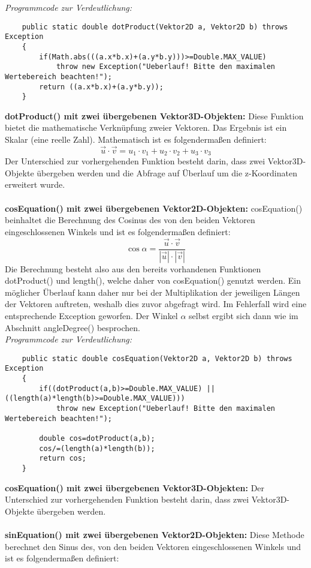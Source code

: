 \documentclass[a4paper,11pt]{scrartcl}
\begin{document}
\textit{Programmcode zur Verdeutlichung:}
\begin{lstlisting}
	public static double dotProduct(Vektor2D a, Vektor2D b) throws Exception
	{
		if(Math.abs(((a.x*b.x)+(a.y*b.y)))>=Double.MAX_VALUE)
			throw new Exception("Ueberlauf! Bitte den maximalen Wertebereich beachten!");
		return ((a.x*b.x)+(a.y*b.y));
	}
\end{lstlisting} $\;$ \\
\textbf{dotProduct() mit zwei übergebenen Vektor3D-Objekten:} Diese Funktion bietet die mathematische Verknüpfung zweier Vektoren. Das Ergebnis ist ein Skalar (eine reelle Zahl).
Mathematisch ist es folgendermaßen definiert:
\[ \vec u \cdot \vec v = u_1 \cdot v_1 + u_2 \cdot v_2 + u_3 \cdot v_3\]
Der Unterschied zur vorhergehenden Funktion besteht darin, dass zwei Vektor3D-Objekte übergeben werden und die Abfrage auf Überlauf um die z-Koordinaten erweitert wurde.\\
\\
\textbf{cosEquation() mit zwei übergebenen Vektor2D-Objekten:} cosEquation() beinhaltet die Berechnung des Cosinus des von den beiden Vektoren eingeschlossenen Winkels und ist es folgendermaßen definiert:
\[ \cos \alpha = \frac{\vec u \cdot \vec v}{| \vec  u | \cdot | \vec  v | } \]
Die Berechnung besteht also aus den bereits vorhandenen Funktionen dotProduct() und length(), welche daher von cosEquation() genutzt werden. Ein möglicher Überlauf kann daher nur bei der Multiplikation der jeweiligen Längen der Vektoren auftreten, weshalb dies zuvor abgefragt wird. Im Fehlerfall wird eine entsprechende Exception geworfen.
Der Winkel $\alpha$ selbst ergibt sich dann wie im Abschnitt angleDegree() besprochen.\\
\textit{Programmcode zur Verdeutlichung:}
\begin{lstlisting}
	public static double cosEquation(Vektor2D a, Vektor2D b) throws Exception
	{
		if((dotProduct(a,b)>=Double.MAX_VALUE) || ((length(a)*length(b)>=Double.MAX_VALUE)))
			throw new Exception("Ueberlauf! Bitte den maximalen Wertebereich beachten!");
		
		double cos=dotProduct(a,b);
		cos/=(length(a)*length(b));
		return cos;
	}
\end{lstlisting} $\;$ \\
\textbf{cosEquation() mit zwei übergebenen Vektor3D-Objekten:} Der Unterschied zur vorhergehenden Funktion besteht darin, dass zwei Vektor3D-Objekte übergeben werden.\\
\\
\textbf{sinEquation() mit zwei übergebenen Vektor2D-Objekten:} Diese Methode berechnet den Sinus des, von den beiden Vektoren eingeschlossenen Winkels und ist es folgendermaßen definiert:
\end{document}
